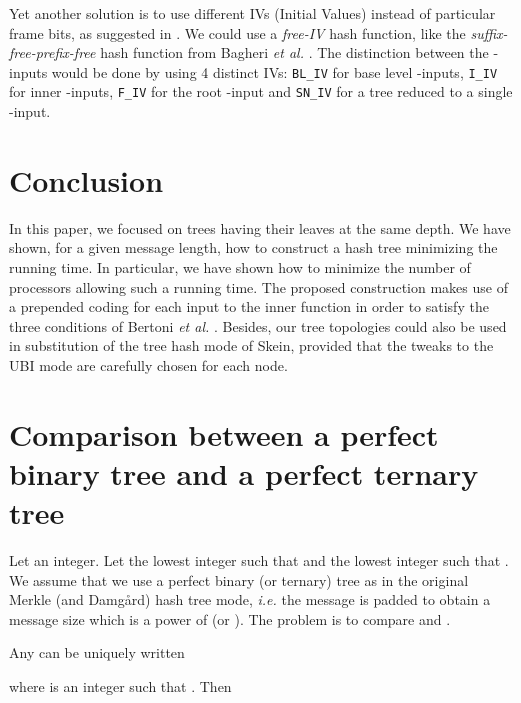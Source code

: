 \documentclass{llncs}
\begin{document}
\begin{remark}
 Yet another solution is to use different IVs (Initial Values) instead of particular frame bits, as suggested in \cite{BDPV14_Suf,luk13}. We could use a \emph{free-IV} hash function,
 like the \emph{suffix-free-prefix-free} hash function from Bagheri \emph{et al.} \cite{BGKZ12}. The distinction between the -inputs would be done by using 4 distinct 
 IVs: \texttt{BL\_IV} for base level -inputs, \texttt{I\_IV} for inner -inputs, \texttt{F\_IV} for the root -input and \texttt{SN\_IV} for a tree reduced to
 a single -input.
\end{remark}



\section{Conclusion}

In this paper, we focused on trees having their leaves at the same depth. 
We have shown, for a given message length, 
how to construct a hash tree minimizing the running time. 
In particular, we have shown how to minimize the
number of processors allowing such a running time. 
The proposed construction makes use of a prepended 
coding for each input to the inner function in order to satisfy 
the three conditions of Bertoni \textit{et al.} \cite{BDPV14_Suf}.
Besides, our tree topologies could also be used in substitution of
the tree hash mode of Skein, provided that the tweaks to 
the UBI mode are carefully chosen for each node.







\newpage

\appendix

\section{Comparison between a perfect binary tree and a perfect ternary tree}\label{comp}
Let  an integer.
Let  the lowest integer such that  and  the lowest integer such that .
We assume that we use a perfect binary (or ternary) tree as in the original Merkle (and Damg{\aa}rd) hash tree mode,
\emph{i.e.} the message is padded to obtain a message size which is a power of  (or ).
The problem is to compare  and .

Any  can be uniquely written

where  is an integer such that . Then
\end{document}
